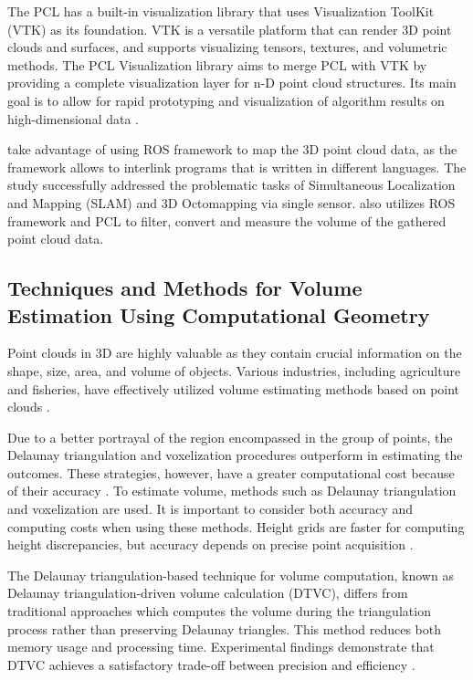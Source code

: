 The PCL has a built-in visualization library that uses Visualization ToolKit (VTK) as its foundation. VTK is a versatile platform that can render 3D point clouds and surfaces, and supports visualizing tensors, textures, and volumetric methods. The PCL Visualization library aims to merge PCL with VTK by providing a complete visualization layer for n-D point cloud structures. Its main goal is to allow for rapid prototyping and visualization of algorithm results on high-dimensional data \citep{rusu2011}.

\citet{ocando2017} take advantage of using ROS framework to map the 3D point cloud data, as the framework allows to interlink programs that is written in different languages. The study successfully addressed the problematic tasks of Simultaneous Localization and Mapping (SLAM) and 3D Octomapping via single sensor. \citet{clar2022} also utilizes ROS framework and PCL to filter, convert and measure the volume of the gathered point cloud data.

\subsection{Techniques and Methods for Volume Estimation Using Computational Geometry}

Point clouds in 3D are highly valuable as they contain crucial information on the shape, size, area, and volume of objects. Various industries, including agriculture and fisheries, have effectively utilized volume estimating methods based on point clouds \citep{geuvara2020}.

Due to a better portrayal of the region encompassed in the group of points, the Delaunay triangulation and voxelization procedures outperform in estimating the outcomes. These strategies, however, have a greater computational cost because of their accuracy \citep{chee2015}. To estimate volume, methods such as Delaunay triangulation and voxelization are used. It is important to consider both accuracy and computing costs when using these methods. Height grids are faster for computing height discrepancies, but accuracy depends on precise point acquisition \citep{bewley2011, duff2000}.

The Delaunay triangulation-based technique for volume computation, known as Delaunay triangulation-driven volume calculation (DTVC), differs from traditional approaches which computes the volume during the triangulation process rather than preserving Delaunay triangles. This method reduces both memory usage and processing time. Experimental findings demonstrate that DTVC achieves a satisfactory trade-off between precision and efficiency \citep{liuY2021}.

